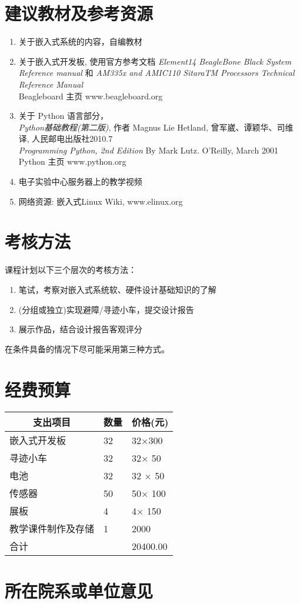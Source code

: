 \documentclass{article}
\begin{document}
\section{建议教材及参考资源}
 \begin{enumerate} \itemsep=-3pt
    \item 关于嵌入式系统的内容，自编教材
    \item 关于嵌入式开发板, 使用官方参考文档
        {\em  Element14 BeagleBone Black System Reference manual}
         和
         {\em AM335x and AMIC110 SitaraTM Processors
         Technical Reference Manual} \\
         Beagleboard 主页   www.beagleboard.org
     \item 关于 Python 语言部分，\\
         {\em Python基础教程(第二版)},
          作者 Magnus Lie Hetland, 曾军崴、谭颖华、司维译,
          人民邮电出版社2010.7\\
          {\em  Programming Python, 2nd Edition}
          By Mark Lutz. O'Reilly, March 2001 \\
        Python 主页 www.python.org
    \item 电子实验中心服务器上的教学视频
    \item 网络资源: 嵌入式Linux Wiki, www.elinux.org
 \end{enumerate}

\section{考核方法}
课程计划以下三个层次的考核方法：
  \begin{enumerate} \itemsep=-3pt
    \item 笔试，考察对嵌入式系统软、硬件设计基础知识的了解
    \item (分组或独立)实现避障/寻迹小车，提交设计报告
    \item 展示作品，结合设计报告客观评分
  \end{enumerate}

  在条件具备的情况下尽可能采用第三种方式。

\section{经费预算}
\begin{center}
    \large
    \begin{tabular}{|l|l|l|}\hline
        \multicolumn{1}{|c|}{支出项目} &
        \multicolumn{1}{c|}{数量} &
        \multicolumn{1}{c|}{价格(元)} \\\hline
        嵌入式开发板 & 32  & 32$\times$300 \\
        寻迹小车  & 32 & 32$\times$ 50 \\
        电池    & 32 & 32 $\times $ 50 \\
        传感器    & 50 & 50$\times$ 100  \\
        展板        &  4   & 4$\times$ 150 \\
        教学课件制作及存储   & 1  & 2000 \\\hline
        合计  &    & 20400.00        \\
    \hline
    \end{tabular}
\end{center}

\section{所在院系或单位意见}
\end{document}
